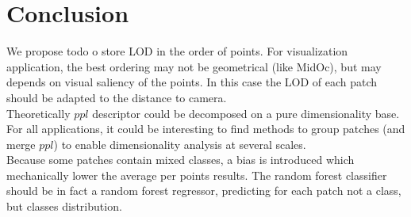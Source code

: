 

\section{Conclusion} 
	We propose todo
	o store LOD in the order of points. For visualization application, the best ordering may not be geometrical (like MidOc), but may depends on visual saliency of the points. In this case the LOD of each patch should be adapted to the distance to camera.
	\\
	Theoretically $ppl$ descriptor could be decomposed on a pure dimensionality base.
	For all applications, it could be interesting to find methods to group patches (and merge $ppl$) to enable dimensionality analysis at several scales.
	\\
	Because some patches contain mixed classes, a bias is introduced which mechanically lower the average per points results. The random forest classifier should be in fact a random forest regressor, predicting for each patch not a class, but classes distribution.
	 